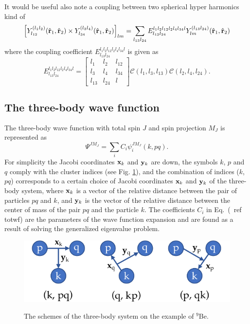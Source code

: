 \documentclass[12pt,a4paper,twoside]{article}
\begin{document}
It would be useful also note a coupling between two spherical hyper harmonics kind of
\begin{equation}
\left[ Y^{(l_1l_2)}_{l_{12}}(\hat{{\bf r}}_1,\hat{{\bf r}}_2) \times Y^{(l_3l_4)}_{l_{34}}(\hat{{\bf r}}_1,\hat{{ \bf r}}_2) \right]_{lm}= \sum_{l_{13}l_{24}} {E}^{l_1l_2l_{12}l_2l_4l_{34}l}_{l_{13}l_{24}}  Y^{(l_{13}l_{24})}_{lm}(\hat{{\bf r}}_1,\hat{{\bf r}}_2)
\label{hyperSphTrans}
\end{equation}
where the coupling coefficient ${E}^{l_1l_2l_{12}l_2l_4l_{34}l}_{l_{13}l_{24}}$ is given as
\begin{equation}
{E}^{l_1l_2l_{12}l_2l_4l_{34}l}_{l_{13}l_{24}} = 
\begin{bmatrix}
l_1 & l_2 & l_{12} \\ 
l_3 & l_4 & l_{34} \\ 
l_{13} & l_{24} & l
\end{bmatrix}
\mathcal{C}(l_1,l_3,l_{13})\mathcal{C}(l_2,l_4,l_{24}).
\end{equation}

  

\subsection{The three-body wave function}

The three-body wave function with total spin $ J $ and spin projection $ M_J $ is represented as
 \begin{equation}
 \Psi^{JM_J}= \sum_{i} C_{i} \psi_{i}^{JM_J} \left( k,pq \right).
 \label{totwf}
 \end{equation}
For simplicity the Jacobi coordinates $ {\bf x}_k $ and $ {\bf y}_k $ are down, the symbols $ k $, $ p $ and $ q $ comply with the cluster indices (see Fig. \ref{fig:jacobiSet}), and the combination of indices ($ k $, $ pq $) corresponds to a certain choice of Jacobi coordinates $ {\bf x}_k $ and $ {\bf y}_k $ of the three-body system, where $ {\bf x}_k $ is a vector of the relative distance between the pair of particles $ pq $ and $ k $, and $ {\bf y}_k $ is the vector of the relative distance between the center of mass of the pair $ pq $ and the particle $ k $. 
The coefficients $ C_{i} $ in Eq.~(\ ref {totwf}) are the parameters of the wave function expansion and are found as a result of solving the generalized eigenvalue problem. 

\begin{figure}[h!]
\centering
\includegraphics[scale=0.15]{pic1}\\

\caption{The schemes of the three-body system on the example of ${}^9$Be.}

\label{fig:jacobiSet}
\end{figure}
\end{document}
